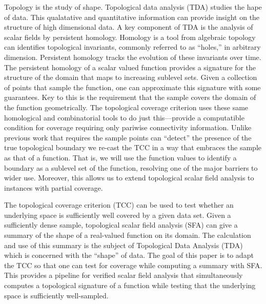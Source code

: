 
Topology is the study of shape.
Topological data analysis (TDA) studies the hape of data.
This qualatative and quantitative information can provide insight on the structure of high dimensional data.
A key component of TDA is the analysis of scalar fields by persistent homology.
Homology is a tool from algebraic topology can identifies topological invariants, commonly referred to as ``holes,'' in arbitrary dimension.
Persistent homology tracks the evolution of these invariants over time.
The persistent homology of a scalar valued function provides a signature for the structure of the domain that maps to increasing sublevel sets.
Given a collection of points that sample the function, one can approximate this signature with some guarantees.
Key to this is the requirement that the sample covers the domain of the function geometrically.
The topological coverage criterion uses these same homological and combinatorial tools to do just this---provide a computatible condition for coverage requiring only pariwise connectivity information.
Unlike previous work that requires the sample points can ``detect'' the presence of the true topological boundary we re-cast the TCC in a way that embraces the sample as that of a function.
That is, we will use the function values to identify a boundary as a sublevel set of the function, resolving one of the major barriers to wider use.
Moreover, this allows us to extend topological scalar field analysis to instances with partial coverage.


The topological coverage criterion (TCC) can be used to test whether an underlying space is sufficiently well covered by a given data set.
Given a sufficiently dense sample, topological scalar field analysis (SFA) can give a summary of the shape of a real-valued function on its domain.
The calculation and use of this summary is the subject of Topological Data Analysis (TDA) which is concerned with the ``shape'' of data.
The goal of this paper is to adapt the TCC so that one can test for coverage while computing a summary with SFA.
This provides a pipeline for verified scalar field analysis that simultaneously computes a topological signature of a function while testing that the underlying space is sufficiently well-sampled.

